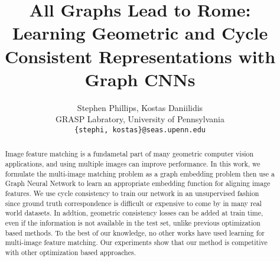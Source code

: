 \documentclass[10pt,twocolumn,letterpaper]{article}
\begin{document}
\title{All Graphs Lead to Rome: Learning Geometric and Cycle Consistent Representations with Graph CNNs}

\author{Stephen Phillips, Kostas Daniilidis \\
GRASP Labratory, University of Pennsylvania\\
{\tt\small \{stephi, kostas\}@seas.upenn.edu}
}



\maketitle


\begin{abstract}
    Image feature matching is a fundametal part of many geometric computer vision applications, and using multiple images can improve performance.
    In this work, we formulate the multi-image matching problem as a graph embedding problem then use a Graph Neural Network to learn an appropriate embedding function for aligning image features. %
    We use cycle consistency to train our network in an unsupervised fashion since ground truth correspondence is difficult or expensive to come by in many real world datasets.
    In addtion, geometric consistency losses can be added at train time, even if the information is not available in the test set, unlike previous optimization based methods.
    To the best of our knowledge, no other works have used learning for multi-image feature matching.
    Our experiments show that our method is competitive with other optimization based approaches.
\end{abstract}
\end{document}
